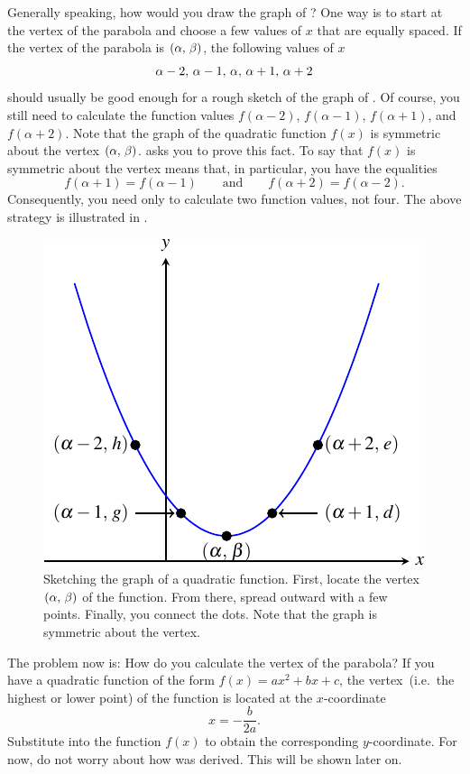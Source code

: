 \documentclass[a4paper,oneside,12pt]{article}
\begin{document}
Generally speaking, how would you draw the graph of
?  One way is to start at the
vertex of the parabola and choose a few values of $x$ that are equally
spaced.  If the vertex of the parabola is $\left\lparen{\alpha},\, {\beta}\right\rparen$, the
following values of $x$
\[
{\alpha-2},\, {\alpha-1},\, {\alpha},\, {\alpha+1},\, {\alpha+2}
\]
should usually be good enough for a rough sketch of the graph of
.  Of course, you still need
to calculate the function values $f(\alpha-2)$, $f(\alpha-1)$,
$f(\alpha+1)$, and $f(\alpha+2)$.  Note that the graph of the
quadratic function $f(x)$ is symmetric about the vertex
$\left\lparen{\alpha},\, {\beta}\right\rparen$.
 asks you to prove this
fact.  To say that $f(x)$ is symmetric about the vertex means that, in
particular, you have the equalities
\[
f(\alpha+1) = f(\alpha-1)
\qquad
\text{and}
\qquad
f(\alpha+2) = f(\alpha-2).
\]
Consequently, you need only to calculate two function values, not
four.  The above strategy is illustrated in
.

\begin{figure}[!htbp]
\centering
\includegraphics[scale=1.2]{image/07/a1-bminus4-c10.pdf}
\caption{%
  Sketching the graph of a quadratic function.  First, locate the
  vertex $\left\lparen{\alpha},\, {\beta}\right\rparen$ of the function.  From there, spread
  outward with a few points.  Finally, you connect the dots.  Note
  that the graph is symmetric about the vertex.
}
\label{fig:sketch_parabola}
\end{figure}

The problem now is: How do you calculate the vertex of the parabola?
If you have a quadratic function of the form $f(x) = ax^2 + bx + c$,
the vertex~(i.e.~the highest or lower point) of the function is
located at the $x$-coordinate
\begin{equation}
\label{eqn:parabola_tip_x_coordinate}
x
=
-\frac{b}{2a}.
\end{equation}
Substitute  into the
function $f(x)$ to obtain the corresponding $y$-coordinate.  For now,
do not worry about how  was
derived.  This will be shown later on.
\end{document}
